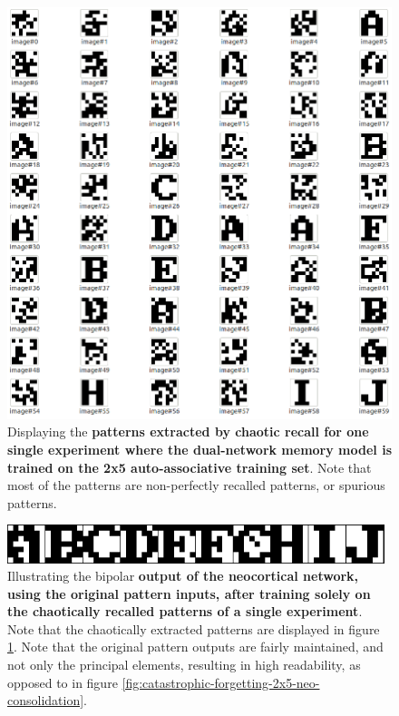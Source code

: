 \begin{figure}
    \centering
    \includegraphics[width=13cm]{fig/neo-consolidation/chaotic-recall-2x5-15-iters-exp0}
    \caption{Displaying the \textbf{patterns extracted by chaotic recall for one single experiment where the dual-network memory model is trained on the 2x5 auto-associative training set}. Note that most of the patterns are non-perfectly recalled patterns, or spurious patterns.}
    \label{fig:chaotic-recall-2x5-15-iters-exp0}
\end{figure}

\begin{figure}
    \centering
    \includegraphics[width=11cm]{fig/neo-consolidation/one-2x5-run-sync-15-iters42-exp0-15-iters}
    \caption{Illustrating the bipolar \textbf{output of the neocortical network, using the original pattern inputs, after training solely on the chaotically recalled patterns of a single experiment}. Note that the chaotically extracted patterns are displayed in figure \ref{fig:chaotic-recall-2x5-15-iters-exp0}. Note that the original pattern outputs are fairly maintained, and not only the principal elements, resulting in high readability, as opposed to in figure \ref{fig:catastrophic-forgetting-2x5-neo-consolidation}.}
    \label{fig:sync-neo-aggregate-output-2x5}
\end{figure}

